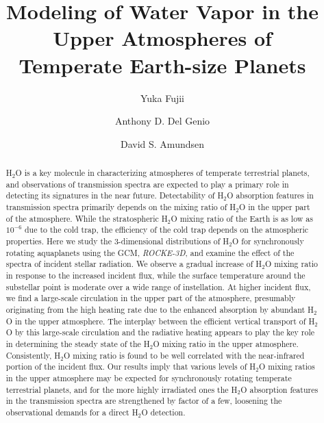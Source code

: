 \documentclass[11pt,numberedappendix,twocolappendix,]{emulateapj}
\def\water{H$_2$O }
\def\modelE{{\it ROCKE-3D}}
\begin{document}
\title{Modeling of Water Vapor in the Upper Atmospheres of 
\\Temperate Earth-size Planets}
\author{Yuka Fujii}
\author{Anthony D. Del Genio}
\author{David S. Amundsen}

\begin{abstract}

\water is a key molecule in characterizing atmospheres of temperate terrestrial planets, and observations of transmission spectra are expected to play a primary role in detecting its signatures in the near future. 
%
Detectability of \water absorption features in transmission spectra primarily depends on the mixing ratio of \water in the upper part of the atmosphere. 
%
While the stratospheric \water mixing ratio of the Earth is as low as $10^{-6}$ due to the cold trap, the efficiency of the cold trap depends on the atmospheric properties. 
%
Here we study the 3-dimensional distributions of \water for synchronously rotating aquaplanets using the GCM, \modelE, and examine the effect of the  spectra of incident stellar radiation. 
%
We observe a gradual increase of \water mixing ratio in response to the increased incident flux, while the surface temperature around the substellar point is moderate over a wide range of instellation. 
%
At higher incident flux, we find a large-scale circulation in the upper part of the atmosphere, presumably originating from the high heating rate due to the enhanced absorption by abundant \water in the upper atmosphere. 
%
The interplay between the efficient vertical transport of \water by this large-scale circulation and the radiative heating appears to play the key role in determining the steady state of the \water mixing ratio in the upper atmosphere.  
%
Consistently, \water mixing ratio is found to be well correlated with the near-infrared portion of the incident flux. 
%
Our results imply that various levels of \water mixing ratios in the upper atmosphere may be expected for synchronously rotating temperate terrestrial planets, and for the more highly irradiated ones the \water absorption features in the transmission spectra are strengthened by factor of a few, loosening the observational demands for a direct H$_2$O detection. 
%
\end{abstract}
\end{document}
